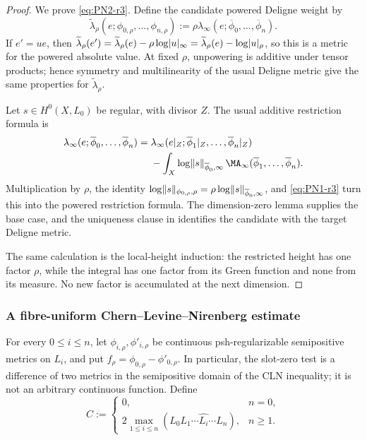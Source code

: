 \medskip
\begin{proof}
We prove \eqref{eq:PN2-r3}.  Define the candidate powered Deligne weight by
\begin{equation}
 \widetilde\lambda_\rho
 (e;\phi_{0,\rho},\ldots,\phi_{n,\rho})
 :=\rho\lambda_\infty
 (e;\overline\phi_0,\ldots,\overline\phi_n).
\label{eq:PN2-candidate-r3}
\end{equation}
If $e'=ue$, then
$
\widetilde\lambda_\rho(e')=\widetilde\lambda_\rho(e)
-\rho\log\lvert u\rvert_\infty
=\widetilde\lambda_\rho(e)-\log\lvert u\rvert_\rho
$, so this is a metric for the powered absolute value.
At fixed $\rho$, unpowering is additive under tensor products; hence
symmetry and multilinearity of the usual Deligne metric give the same
properties for $\widetilde\lambda_\rho$.

Let $s\in H^0(X,L_0)$ be regular, with divisor $Z$.  The usual additive
restriction formula is
\begin{align*}
 \lambda_\infty(e;\overline\phi_0,\ldots,\overline\phi_n)
 ={}&\lambda_\infty(e|_Z;
       \overline\phi_1|_Z,\ldots,\overline\phi_n|_Z)\\
 &-\int_X\log\norm{s}_{\overline\phi_0,\infty}
       \,\MA_\infty(\overline\phi_1,\ldots,\overline\phi_n).
\end{align*}
Multiplication by $\rho$, the identity
$
 \log\lVert s\rVert_{\phi_{0,\rho},\rho}
 =\rho\log\lVert s\rVert_{\overline\phi_0,\infty}
$, and \eqref{eq:PN1-r3} turn this into the powered restriction formula.  The
dimension-zero lemma supplies the base case, and the uniqueness clause in
\cite[Theorem~8.16]{BE21} identifies the candidate with the target Deligne
metric.

The same calculation is the local-height induction: the restricted height
has one factor $\rho$, while the integral has one factor from its Green
function and none from its measure.  No new factor is accumulated at the
next dimension.
\end{proof}

\subsubsection{A fibre-uniform Chern--Levine--Nirenberg estimate}

For every $0\leq i\leq n$, let
$\phi_{i,\rho},\phi'_{i,\rho}$ be continuous psh-regularizable
semipositive metrics on $L_i$, and put
$f_\rho=\phi_{0,\rho}-\phi'_{0,\rho}$.  In particular, the slot-zero
test is a difference of two metrics in the semipositive domain of the CLN
inequality; it is not an arbitrary continuous function.  Define
\begin{equation}
 C:=
 \begin{cases}
 0,&n=0,\\[2mm]
 2\displaystyle\max_{1\leq i\leq n}
 (L_0L_1\cdots\widehat{L_i}\cdots L_n),&n\geq1.
 \end{cases}
\label{eq:CLN-C-r3}
\end{equation}

